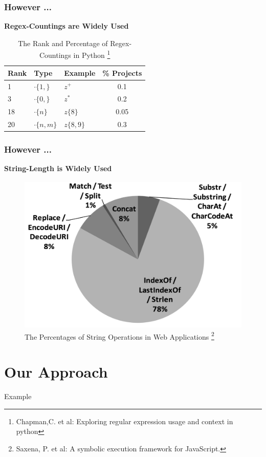\documentclass[landscape]{beamer}
\begin{document}
\begin{frame}[fragile]
  \frametitle{However ...}
  \textbf{Regex-Countings are Widely Used}
  \begin{table}
    \centering
    \begin{tabular}{l l l S[table-format=1.2]}
      \toprule
      \textbf{Rank} & \textbf{Type}  & \textbf{Example} & \textbf{\% Projects} \\
                   & $\cdot\{1,\}$  & $z^+$            & 0.1                  \\
      3             & $\cdot\{0,\}$  & $z^*$            & 0.2                  \\
      18            & $\cdot\{n\}$   & $z\{8\}$         & 0.05                 \\
      20            & $\cdot\{n,m\}$ & $z\{8,9\}$       & 0.3                  \\
      \bottomrule
    \end{tabular}
    \caption{The Rank and Percentage of Regex-Countings in Python \footnote{Chapman,C. et al: Exploring regular expression usage and context in python}}
  \end{table}

\end{frame}

\begin{frame}[fragile]
  \frametitle{However ...}
  \textbf{String-Length is Widely Used}
  \begin{figure}
    \includegraphics[width=.5\linewidth]{length_percentage.jpg}
    \caption{The Percentages of String Operations in Web Applications \footnote{Saxena, P. et al: A symbolic execution framework for JavaScript.}}
  \end{figure}
\end{frame}

\section{Our Approach}
\begin{frame}{Example}
\end{frame}
\end{document}
